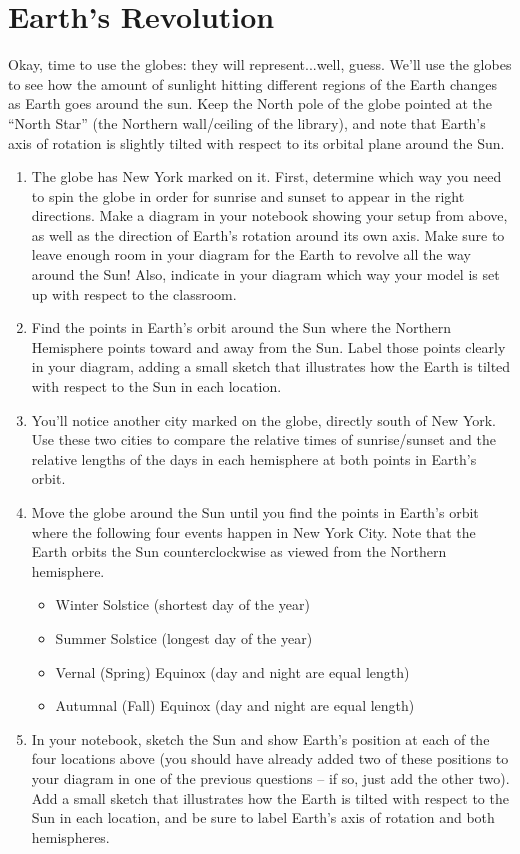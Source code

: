 \documentclass[12pt]{article}%
\begin{document}
\section{Earth's Revolution}
Okay, time to use the globes: they will represent...well, guess. We'll use the globes to see how the amount of sunlight hitting different regions of the Earth changes as Earth goes around the sun. Keep the North pole of the globe pointed at the ``North Star'' (the Northern wall/ceiling of the library), and note that Earth's axis of rotation is slightly tilted with respect to its orbital plane around the Sun.
\begin{enumerate}
\item The globe has New York marked on it. First, determine which way you need to spin the globe in order for sunrise and sunset to appear in the right directions. Make a diagram in your notebook showing your setup from above, as well as the direction of Earth's rotation around its own axis. Make sure to leave enough room in your diagram for the Earth to revolve all the way around the Sun! Also, indicate in your diagram which way your model is set up with respect to the classroom.
\item Find the points in Earth's orbit around the Sun where the Northern Hemisphere points toward and away from the Sun. Label those points clearly in your diagram, adding a small sketch that illustrates how the Earth is tilted with respect to the Sun in each location.
\item You'll notice another city marked on the globe, directly south of New York. Use these two cities to compare the relative times of sunrise/sunset and the relative lengths of the days in each hemisphere at both points in Earth's orbit.
\item Move the globe around the Sun until you find the points in Earth's orbit where the following four events happen in New York City. Note that the Earth orbits the Sun counterclockwise as viewed from the Northern hemisphere.
    \begin{itemize}
    \item Winter Solstice (shortest day of the year)
    \item Summer Solstice (longest day of the year)
    \item Vernal (Spring) Equinox (day and night are equal length)
    \item Autumnal (Fall) Equinox (day and night are equal length)
    \end{itemize}
\item In your notebook, sketch the Sun and show Earth's position at each of the four locations above (you should have already added two of these positions to your diagram in one of the previous questions -- if so, just add the other two). Add a small sketch that illustrates how the Earth is tilted with respect to the Sun in each location, and be sure to label Earth's axis of rotation and both hemispheres.

\end{enumerate}
\end{document}
